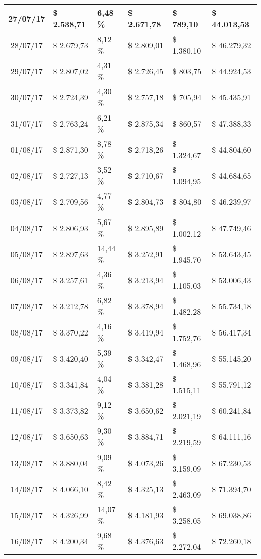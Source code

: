 \begin{small}
\begin{longtable}{|c|l|l|l|l|l|}
27/07/17 & \$ 2.538,71 & 6,48 \% & \$ 2.671,78 & \$ 789,10 & \$ 44.013,53 \\ \hline
28/07/17 & \$ 2.679,73 & 8,12 \% & \$ 2.809,01 & \$ 1.380,10 & \$ 46.279,32 \\ \hline
29/07/17 & \$ 2.807,02 & 4,31 \% & \$ 2.726,45 & \$ 803,75 & \$ 44.924,53 \\ \hline
30/07/17 & \$ 2.724,39 & 4,30 \% & \$ 2.757,18 & \$ 705,94 & \$ 45.435,91 \\ \hline
31/07/17 & \$ 2.763,24 & 6,21 \% & \$ 2.875,34 & \$ 860,57 & \$ 47.388,33 \\ \hline
01/08/17 & \$ 2.871,30 & 8,78 \% & \$ 2.718,26 & \$ 1.324,67 & \$ 44.804,60 \\ \hline
02/08/17 & \$ 2.727,13 & 3,52 \% & \$ 2.710,67 & \$ 1.094,95 & \$ 44.684,65 \\ \hline
03/08/17 & \$ 2.709,56 & 4,77 \% & \$ 2.804,73 & \$ 804,80 & \$ 46.239,97 \\ \hline
04/08/17 & \$ 2.806,93 & 5,67 \% & \$ 2.895,89 & \$ 1.002,12 & \$ 47.749,46 \\ \hline
05/08/17 & \$ 2.897,63 & 14,44 \% & \$ 3.252,91 & \$ 1.945,70 & \$ 53.643,45 \\ \hline
06/08/17 & \$ 3.257,61 & 4,36 \% & \$ 3.213,94 & \$ 1.105,03 & \$ 53.006,43 \\ \hline
07/08/17 & \$ 3.212,78 & 6,82 \% & \$ 3.378,94 & \$ 1.482,28 & \$ 55.734,18 \\ \hline
08/08/17 & \$ 3.370,22 & 4,16 \% & \$ 3.419,94 & \$ 1.752,76 & \$ 56.417,34 \\ \hline
09/08/17 & \$ 3.420,40 & 5,39 \% & \$ 3.342,47 & \$ 1.468,96 & \$ 55.145,20 \\ \hline
10/08/17 & \$ 3.341,84 & 4,04 \% & \$ 3.381,28 & \$ 1.515,11 & \$ 55.791,12 \\ \hline
11/08/17 & \$ 3.373,82 & 9,12 \% & \$ 3.650,62 & \$ 2.021,19 & \$ 60.241,84 \\ \hline
12/08/17 & \$ 3.650,63 & 9,30 \% & \$ 3.884,71 & \$ 2.219,59 & \$ 64.111,16 \\ \hline
13/08/17 & \$ 3.880,04 & 9,09 \% & \$ 4.073,26 & \$ 3.159,09 & \$ 67.230,53 \\ \hline
14/08/17 & \$ 4.066,10 & 8,42 \% & \$ 4.325,13 & \$ 2.463,09 & \$ 71.394,70 \\ \hline
15/08/17 & \$ 4.326,99 & 14,07 \% & \$ 4.181,93 & \$ 3.258,05 & \$ 69.038,86 \\ \hline
16/08/17 & \$ 4.200,34 & 9,68 \% & \$ 4.376,63 & \$ 2.272,04 & \$ 72.260,18 \\ \hline

\end{longtable}
\end{small}
